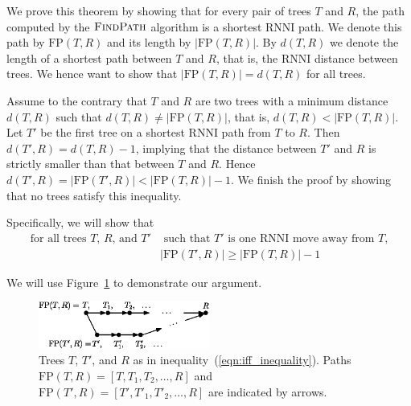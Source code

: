 \documentclass[11pt]{amsart}
\newcommand{\rnni}{\mathrm{RNNI}}
\newcommand{\findpath}{\textsc{FindPath}}
\newcommand{\fp}{\mathrm{FP}}
\begin{document}
\proof
We prove this theorem by showing that for every pair of trees $T$ and $R$, the path computed by the $\findpath$ algorithm is a shortest $\rnni$ path.
We denote this path by $\fp(T, R)$ and its length by $|\fp(T, R)|$.
By $d(T, R)$ we denote the length of a shortest path between $T$ and $R$, that is, the $\rnni$ distance between trees.
We hence want to show that $|\fp(T, R)| = d(T, R)$ for all trees.

Assume to the contrary that $T$ and $R$ are two trees with a minimum distance $d(T, R)$ such that $d(T,R) \neq |\fp(T,R)|$, that is, $d(T,R) < |\fp(T,R)|$.
Let $T'$ be the first tree on a shortest $\rnni$ path from $T$ to $R$.
Then $d(T',R) = d(T, R) - 1$, implying that the distance between $T'$ and $R$ is strictly smaller than that between $T$ and $R$.
Hence $d(T', R) = |\fp(T',R)| < |\fp(T,R)| - 1$.
We finish the proof by showing that no trees satisfy this inequality.

Specifically, we will show that
\begin{equation}
\begin{split}
\mbox{for all trees $T$, $R$, and $T'$}	& \mbox{ such that $T'$ is one $\rnni$ move away from $T$,}\\
					&|\fp(T',R)| \geq |\fp(T,R)| - 1
\end{split}
 \label{eqn:iff_inequality}
\end{equation}

We will use Figure~\ref{fig:proof_idea} to demonstrate our argument.

\begin{figure}[ht]
\centering
\includegraphics[width=0.5\textwidth]{proof_idea_ag}
\caption{Trees $T$, $T'$, and $R$ as in inequality~(\ref{eqn:iff_inequality}).
Paths $\fp(T,R) = [T,T_1,T_2, \ldots, R]$ and $\fp(T',R) = [T',T'_1,T'_2, \ldots, R]$ are indicated by arrows.}
\label{fig:proof_idea}
\end{figure}
\end{document}
